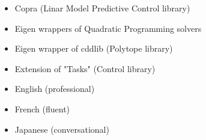 








\divider

\divider

\divider

\divider

\divider

\divider

\divider



\begin{itemize}[leftmargin=7mm]
    \item Copra (Linar Model Predictive Control library)
    \item Eigen wrappers of Quadratic Programming solvers
    \item Eigen wrapper of cddlib (Polytope library)
    \item Extension of "Tasks" (Control library)
\end{itemize}


\begin{itemize}[leftmargin=7mm]
    \item English (professional)
    \item French (fluent)
    \item Japanese (conversational)
\end{itemize}


